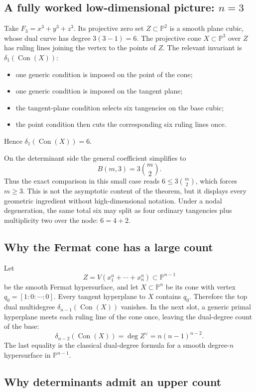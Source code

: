 \documentclass[acmsmall,screen,nonacm]{acmart}
\theoremstyle{definition}
\theoremstyle{remark}
\DeclareMathOperator{\Con}{Con}
\newcommand{\PP}{\mathbb{P}}
\newcommand{\pdeg}{\delta}
\begin{document}
\subsection{A fully worked low-dimensional picture: $n=3$}

Take $F_3=x^3+y^3+z^3$.  Its projective zero set
$Z\subset\PP^2$ is a smooth plane cubic, whose dual curve has degree
$3(3-1)=6$.  The projective cone $X\subset\PP^3$ over $Z$ has ruling
lines joining the vertex to the points of $Z$.  The relevant invariant is
$\pdeg_1(\Con(X))$:
\begin{itemize}[leftmargin=2em,itemsep=1pt]
\item one generic condition is imposed on the point of the cone;
\item one generic condition is imposed on the tangent plane;
\item the tangent-plane condition selects six tangencies on the base cubic;
\item the point condition then cuts the corresponding six ruling lines once.
\end{itemize}
Hence $\pdeg_1(\Con(X))=6$.

On the determinant side the general coefficient simplifies to
\[
  B(m,3)=3\binom{m}{2}.
\]
Thus the exact comparison in this small case reads
$6\le3\binom{m}{2}$, which forces $m\ge3$.  This is not the asymptotic
content of the theorem, but it displays every geometric ingredient without
high-dimensional notation.  Under a nodal degeneration, the same total six
may split as four ordinary tangencies plus multiplicity two over the node:
$6=4+2$.

\subsection{Why the Fermat cone has a large count}

Let
\[
  Z=V(x_1^n+\cdots+x_n^n)\subset\PP^{n-1}
\]
be the smooth Fermat hypersurface, and let $X\subset\PP^n$ be its cone with vertex $q_0=[1:0:\cdots:0]$.  Every tangent hyperplane to $X$ contains $q_0$.  Therefore the top dual multidegree $\pdeg_{n-1}(\Con(X))$ vanishes.  In the next slot, a generic primal hyperplane meets each ruling line of the cone once, leaving the dual-degree count of the base:
\[
  \pdeg_{n-2}(\Con(X))=\deg Z^\vee=n(n-1)^{n-2}.
\]
The last equality is the classical dual-degree formula for a smooth degree-$n$ hypersurface in $\PP^{n-1}$.

\subsection{Why determinants admit an upper count}
\end{document}
